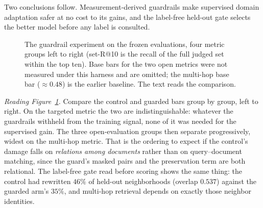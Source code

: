 \documentclass[11pt,letterpaper]{article}
\begin{document}
Two conclusions follow. Measurement-derived guardrails make supervised
domain adaptation safer at no cost to its gains, and the label-free
held-out gate selects the better model before any label is consulted.

\begin{figure}[t]
\centering
{}
\caption{The guardrail experiment on the frozen evaluations, four metric
groups left to right (set-R@10 is the recall of the full judged set within
the top ten). Base bars for the two open metrics were not measured under
this harness and are omitted; the multi-hop base bar ($\approx 0.48$) is
the earlier baseline. The text reads the comparison.}
\label{fig:guardfig}
\end{figure}

\emph{Reading Figure~\ref{fig:guardfig}.} Compare the control and guarded
bars group by group, left to right. On the targeted metric the two are
indistinguishable: whatever the guardrails withheld from the training
signal, none of it was needed for the supervised gain. The three
open-evaluation groups then separate progressively, widest on the
multi-hop metric. That is the ordering to expect if the control's damage
falls on \emph{relations among documents} rather than on query--document
matching, since the guard's masked pairs and the preservation term are
both relational. The label-free gate read before scoring shows the same
thing: the control had rewritten $46\%$ of held-out neighborhoods (overlap
$0.537$) against the guarded arm's $35\%$, and multi-hop retrieval
depends on exactly those neighbor identities.
\end{document}
